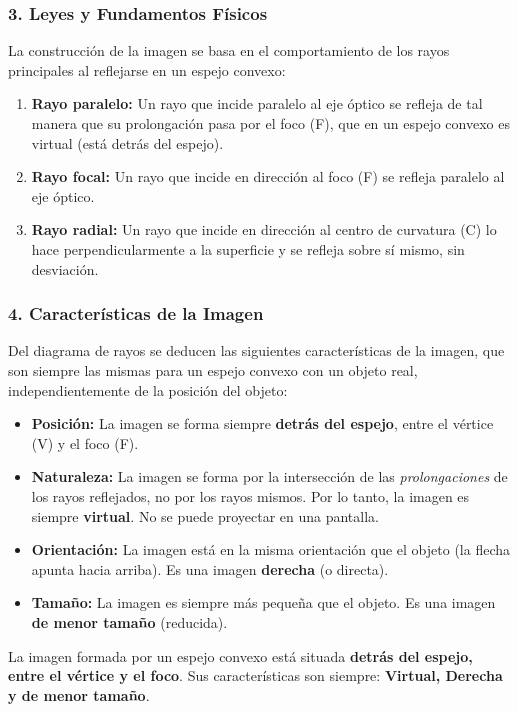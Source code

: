 \subsubsection*{3. Leyes y Fundamentos Físicos}
La construcción de la imagen se basa en el comportamiento de los rayos principales al reflejarse en un espejo convexo:
\begin{enumerate}
    \item \textbf{Rayo paralelo:} Un rayo que incide paralelo al eje óptico se refleja de tal manera que su prolongación pasa por el foco (F), que en un espejo convexo es virtual (está detrás del espejo).
    \item \textbf{Rayo focal:} Un rayo que incide en dirección al foco (F) se refleja paralelo al eje óptico.
    \item \textbf{Rayo radial:} Un rayo que incide en dirección al centro de curvatura (C) lo hace perpendicularmente a la superficie y se refleja sobre sí mismo, sin desviación.
\end{enumerate}

\subsubsection*{4. Características de la Imagen}
Del diagrama de rayos se deducen las siguientes características de la imagen, que son siempre las mismas para un espejo convexo con un objeto real, independientemente de la posición del objeto:
\begin{itemize}
    \item \textbf{Posición:} La imagen se forma siempre \textbf{detrás del espejo}, entre el vértice (V) y el foco (F).
    \item \textbf{Naturaleza:} La imagen se forma por la intersección de las \textit{prolongaciones} de los rayos reflejados, no por los rayos mismos. Por lo tanto, la imagen es siempre \textbf{virtual}. No se puede proyectar en una pantalla.
    \item \textbf{Orientación:} La imagen está en la misma orientación que el objeto (la flecha apunta hacia arriba). Es una imagen \textbf{derecha} (o directa).
    \item \textbf{Tamaño:} La imagen es siempre más pequeña que el objeto. Es una imagen \textbf{de menor tamaño} (reducida).
\end{itemize}

\begin{cajaresultado}
La imagen formada por un espejo convexo está situada \textbf{detrás del espejo, entre el vértice y el foco}. Sus características son siempre: \textbf{Virtual, Derecha y de menor tamaño}.
\end{cajaresultado}


